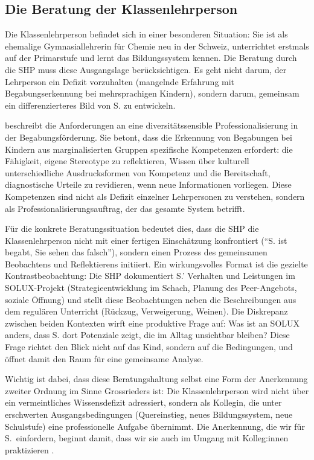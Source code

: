 \documentclass[ngerman, a4paper]{article}
\begin{document}
\subsection{Die Beratung der Klassenlehrperson}

Die Klassenlehrperson befindet sich in einer besonderen Situation: Sie ist als
ehemalige Gymnasiallehrerin für Chemie neu in der Schweiz, unterrichtet erstmals
auf der Primarstufe und lernt das Bildungssystem kennen. Die Beratung durch die SHP
muss diese Ausgangslage berücksichtigen. Es geht nicht darum, der Lehrperson ein
Defizit vorzuhalten (mangelnde Erfahrung mit Begabungserkennung bei mehrsprachigen
Kindern), sondern darum, gemeinsam ein differenzierteres Bild von S. zu entwickeln.

\textcite{macha2019gender} beschreibt die Anforderungen an eine diversitätssensible Professionalisierung
in der Begabungsförderung. Sie betont, dass die Erkennung von Begabungen bei Kindern
aus marginalisierten Gruppen spezifische Kompetenzen erfordert: die Fähigkeit, eigene
Stereotype zu reflektieren, Wissen über kulturell unterschiedliche Ausdrucksformen
von Kompetenz und die Bereitschaft, diagnostische Urteile zu revidieren, wenn neue
Informationen vorliegen. Diese Kompetenzen sind nicht als Defizit einzelner
Lehrpersonen zu verstehen, sondern als Professionalisierungsauftrag, der das
gesamte System betrifft.

Für die konkrete Beratungssituation bedeutet dies, dass die SHP die
Klassenlehrperson nicht mit einer fertigen Einschätzung konfrontiert
(\enquote{S. ist begabt, Sie sehen das falsch}), sondern einen Prozess des
gemeinsamen Beobachtens und Reflektierens initiiert. Ein wirkungsvolles Format
ist die gezielte Kontrastbeobachtung: Die SHP dokumentiert S.' Verhalten und
Leistungen im SOLUX-Projekt (Strategieentwicklung im Schach, Planung des
Peer-Angebots, soziale Öffnung) und stellt diese Beobachtungen neben die
Beschreibungen aus dem regulären Unterricht (Rückzug, Verweigerung, Weinen). Die
Diskrepanz zwischen beiden Kontexten wirft eine produktive Frage auf: Was ist
an SOLUX anders, dass S. dort Potenziale zeigt, die im Alltag unsichtbar bleiben?
Diese Frage richtet den Blick nicht auf das Kind, sondern auf die Bedingungen,
und öffnet damit den Raum für eine gemeinsame Analyse.

Wichtig ist dabei, dass diese Beratungshaltung selbst eine Form der
Anerkennung zweiter Ordnung im Sinne Grossrieders ist: Die
Klassenlehrperson wird nicht über ein vermeintliches Wissensdefizit
adressiert, sondern als Kollegin, die unter erschwerten
Ausgangsbedingungen (Quereinstieg, neues Bildungssystem, neue Schulstufe)
eine professionelle Aufgabe übernimmt. Die Anerkennung, die wir für S.\
einfordern, beginnt damit, dass wir sie auch im Umgang mit Kolleg:innen
praktizieren \parencite{grossrieder2010anerkennung}.
\end{document}
